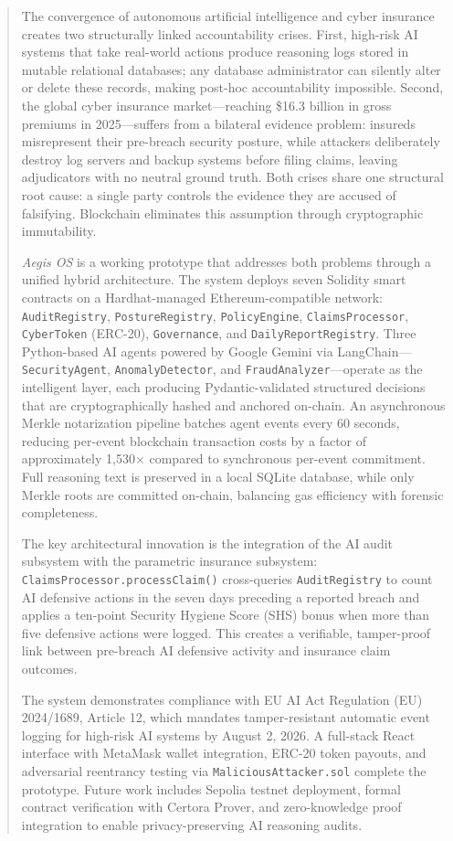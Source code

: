 \documentclass[12pt,a4paper]{article}
\begin{document}
\begin{abstract}
\noindent
The convergence of autonomous artificial intelligence and cyber insurance
creates two structurally linked accountability crises. First, high-risk AI
systems that take real-world actions produce reasoning logs stored in
mutable relational databases; any database administrator can silently alter
or delete these records, making post-hoc accountability impossible. Second,
the global cyber insurance market---reaching \$16.3 billion in gross
premiums in 2025---suffers from a bilateral evidence problem: insureds
misrepresent their pre-breach security posture, while attackers deliberately
destroy log servers and backup systems before filing claims, leaving
adjudicators with no neutral ground truth. Both crises share one structural
root cause: a single party controls the evidence they are accused of
falsifying. Blockchain eliminates this assumption through cryptographic
immutability.

\emph{Aegis OS} is a working prototype that addresses both problems through
a unified hybrid architecture. The system deploys seven Solidity smart
contracts on a Hardhat-managed Ethereum-compatible network:
\texttt{AuditRegistry}, \texttt{PostureRegistry}, \texttt{PolicyEngine},
\texttt{ClaimsProcessor}, \texttt{CyberToken} (ERC-20), \texttt{Governance},
and \texttt{DailyReportRegistry}. Three Python-based AI agents powered by
Google Gemini via LangChain---\texttt{SecurityAgent},
\texttt{AnomalyDetector}, and \texttt{FraudAnalyzer}---operate as the
intelligent layer, each producing Pydantic-validated structured decisions
that are cryptographically hashed and anchored on-chain. An asynchronous
Merkle notarization pipeline batches agent events every 60 seconds,
reducing per-event blockchain transaction costs by a factor of
approximately 1,530$\times$ compared to synchronous per-event commitment.
Full reasoning text is preserved in a local SQLite database, while only
Merkle roots are committed on-chain, balancing gas efficiency with
forensic completeness.

The key architectural innovation is the integration of the AI audit
subsystem with the parametric insurance subsystem: \texttt{ClaimsProcessor.processClaim()}
cross-queries \texttt{AuditRegistry} to count AI defensive actions in the
seven days preceding a reported breach and applies a ten-point Security
Hygiene Score (SHS) bonus when more than five defensive actions were logged.
This creates a verifiable, tamper-proof link between pre-breach AI
defensive activity and insurance claim outcomes.

The system demonstrates compliance with EU AI Act Regulation (EU)
2024/1689, Article 12, which mandates tamper-resistant automatic event
logging for high-risk AI systems by August 2, 2026. A full-stack React
interface with MetaMask wallet integration, ERC-20 token payouts, and
adversarial reentrancy testing via \texttt{MaliciousAttacker.sol} complete
the prototype. Future work includes Sepolia testnet deployment, formal
contract verification with Certora Prover, and zero-knowledge proof
integration to enable privacy-preserving AI reasoning audits.
\end{abstract}
\end{document}
